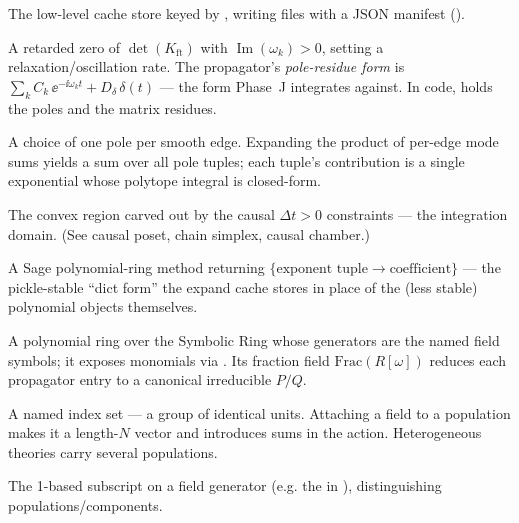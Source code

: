 \begin{description}[leftmargin=0pt,style=nextline]
  \item[PipelineCache] The low-level cache store keyed by ,
        writing  files with a JSON manifest
        ().

  \item[Pole $\omega_k$ / pole-residue form] A retarded zero of
        $\det(K_{\mathrm{ft}})$ with $\operatorname{Im}(\omega_k)>0$, setting a
        relaxation/oscillation rate. The propagator's \emph{pole-residue form} is
        $\sum_k C_k\,\ee^{-\ii\omega_k t}+D_\delta\,\delta(t)$ --- the form Phase~J
        integrates against. In code,  holds the poles and
         the matrix residues.

  \item[Pole tuple $\alpha$] A choice of one pole per smooth edge. Expanding the
        product of per-edge mode sums yields a sum over all pole tuples; each tuple's
        contribution is a single exponential whose polytope integral is closed-form.

  \item[Polytope / chamber] The convex region carved out by the causal
        $\Delta t>0$ constraints --- the integration domain. (See causal poset, chain
        simplex, causal chamber.)

  \item[\code{poly.dict()}] A Sage polynomial-ring method returning
        $\{\text{exponent tuple}\to\text{coefficient}\}$ --- the pickle-stable
        ``dict form'' the expand cache stores in place of the (less stable)
        polynomial objects themselves.

  \item[\code{PolynomialRing(SR, names)} / fraction field] A polynomial ring over the
        Symbolic Ring whose generators are the named field symbols; it exposes
        monomials via . Its fraction field $\mathrm{Frac}(R[\omega])$
        reduces each propagator entry to a canonical irreducible $P/Q$.

  \item[Population] A named index set --- a group of  identical units.
        Attaching a field to a population makes it a length-$N$ vector and introduces
         sums in the action. Heterogeneous theories carry several
        populations.

  \item[\code{pop\_idx} (population index)] The 1-based subscript on a field
        generator (e.g. the  in ), distinguishing
        populations/components.


\end{description}
